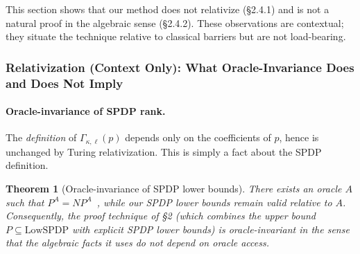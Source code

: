 \documentclass[12pt]{article}
\newtheorem{theorem}{Theorem}
\theoremstyle{definition}
\theoremstyle{definition}
\theoremstyle{remark}
\theoremstyle{remark}
\begin{document}
This section shows that our method does not relativize (\S2.4.1) and is not a natural proof in the algebraic sense (\S2.4.2). These observations are contextual; they situate the technique relative to classical barriers but are not load-bearing.

\subsubsection{Relativization (Context Only): What Oracle-Invariance Does and Does Not Imply}
\label{subsec:relativization-context}

\paragraph{Oracle-invariance of SPDP rank.}
The \emph{definition} of $\Gamma_{\kappa,\ell}(p)$ depends only on the coefficients of $p$,
hence is unchanged by Turing relativization. This is simply a fact about the SPDP definition.

\begin{theorem}[Oracle-invariance of SPDP lower bounds]\label{thm:non-relativizing}
There exists an oracle $A$ such that $P^A = NP^A$~\cite{baker1975}, while our SPDP lower bounds remain valid relative to $A$. Consequently, the proof technique of \S2 (which combines the upper bound $P \subseteq \mathrm{LowSPDP}$ with explicit SPDP lower bounds) is oracle-invariant in the sense that the algebraic facts it uses do not depend on oracle access.
\end{theorem}
\end{document}
